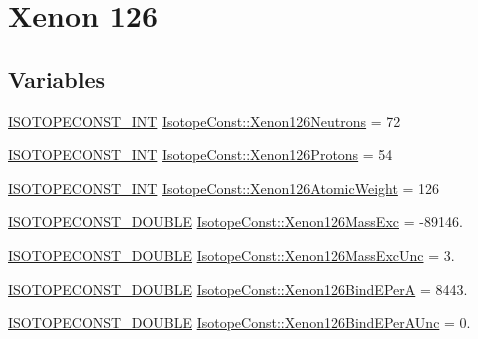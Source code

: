 \hypertarget{group___isotope_const-_xenon-_xe126}{}\section{Xenon 126}
\label{group___isotope_const-_xenon-_xe126}
\subsection*{Variables}
\begin{DoxyCompactItemize}
\item 
\mbox{\hyperlink{group___isotope_const-_macros_ga5f18360b3e99483a35c32d789e62621c}{I\+S\+O\+T\+O\+P\+E\+C\+O\+N\+S\+T\+\_\+\+I\+NT}} \mbox{\hyperlink{group___isotope_const-_xenon-_xe126_ga4866f98ed4c4b088f3a0fa77c71f2a95}{Isotope\+Const\+::\+Xenon126\+Neutrons}} = 72
\item 
\mbox{\hyperlink{group___isotope_const-_macros_ga5f18360b3e99483a35c32d789e62621c}{I\+S\+O\+T\+O\+P\+E\+C\+O\+N\+S\+T\+\_\+\+I\+NT}} \mbox{\hyperlink{group___isotope_const-_xenon-_xe126_gabc512216181d153105a1dda0ab1ce005}{Isotope\+Const\+::\+Xenon126\+Protons}} = 54
\item 
\mbox{\hyperlink{group___isotope_const-_macros_ga5f18360b3e99483a35c32d789e62621c}{I\+S\+O\+T\+O\+P\+E\+C\+O\+N\+S\+T\+\_\+\+I\+NT}} \mbox{\hyperlink{group___isotope_const-_xenon-_xe126_ga39c153406cdf7105ffabd70607b1d2e3}{Isotope\+Const\+::\+Xenon126\+Atomic\+Weight}} = 126
\item 
\mbox{\hyperlink{group___isotope_const-_macros_ga8f45a7272ce02c0b4c65c44636ed719a}{I\+S\+O\+T\+O\+P\+E\+C\+O\+N\+S\+T\+\_\+\+D\+O\+U\+B\+LE}} \mbox{\hyperlink{group___isotope_const-_xenon-_xe126_ga6f0290e27deeb5daccd25c4c645c9cb7}{Isotope\+Const\+::\+Xenon126\+Mass\+Exc}} = -\/89146.
\item 
\mbox{\hyperlink{group___isotope_const-_macros_ga8f45a7272ce02c0b4c65c44636ed719a}{I\+S\+O\+T\+O\+P\+E\+C\+O\+N\+S\+T\+\_\+\+D\+O\+U\+B\+LE}} \mbox{\hyperlink{group___isotope_const-_xenon-_xe126_gae6496a22e8953ddcc8a16f4ada96e496}{Isotope\+Const\+::\+Xenon126\+Mass\+Exc\+Unc}} = 3.
\item 
\mbox{\hyperlink{group___isotope_const-_macros_ga8f45a7272ce02c0b4c65c44636ed719a}{I\+S\+O\+T\+O\+P\+E\+C\+O\+N\+S\+T\+\_\+\+D\+O\+U\+B\+LE}} \mbox{\hyperlink{group___isotope_const-_xenon-_xe126_gaacc1a1920cedd1ea4c03855d9d2c56df}{Isotope\+Const\+::\+Xenon126\+Bind\+E\+PerA}} = 8443.
\item 
\mbox{\hyperlink{group___isotope_const-_macros_ga8f45a7272ce02c0b4c65c44636ed719a}{I\+S\+O\+T\+O\+P\+E\+C\+O\+N\+S\+T\+\_\+\+D\+O\+U\+B\+LE}} \mbox{\hyperlink{group___isotope_const-_xenon-_xe126_gabf532b663d1284c4366bc107ec11b6ea}{Isotope\+Const\+::\+Xenon126\+Bind\+E\+Per\+A\+Unc}} = 0.

\end{DoxyCompactItemize}
